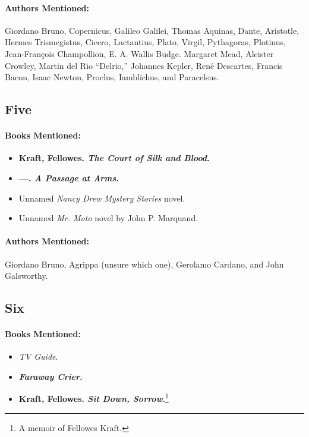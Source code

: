 \documentclass[12pt]{article}
\providecommand{\tightlist}{%
  \setlength{\itemsep}{0pt}\setlength{\parskip}{0pt}}
\begin{document}
\paragraph{Authors Mentioned:}\label{authors-mentioned-8}

Giordano Bruno, Copernicus, Galileo Galilei, Thomas Aquinas, Dante, Aristotle, Hermes Trismegistus, Cicero, Lactantius, Plato, Virgil, Pythagoras, Plotinus, Jean-François Champollion, E. A. Wallis Budge. Margaret Mead, Aleister Crowley, Martin del Rio ``Delrio,'' Johannes Kepler, René Descartes, Francis Bacon, Isaac Newton, Proclus, Iamblichus, and Paracelsus.

\subsection{Five}\label{five-1}

\paragraph{Books Mentioned:}\label{books-mentioned-12}

\begin{itemize}
\tightlist
\item
  \textbf{Kraft, Fellowes. \emph{The Court of Silk and Blood}.}
\item
  \textbf{---. \emph{A Passage at Arms}.}
\item
  Unnamed \emph{Nancy Drew Mystery Stories} novel.
\item
  Unnamed \emph{Mr. Moto} novel by John P. Marquand.
\end{itemize}

\paragraph{Authors Mentioned:}\label{authors-mentioned-9}

Giordano Bruno, Agrippa (unsure which one), Gerolamo Cardano, and John Galsworthy.

\subsection{Six}\label{six-1}

\paragraph{Books Mentioned:}\label{books-mentioned-13}

\begin{itemize}
\tightlist
\item
  \emph{TV Guide}.
\item
  \textbf{\emph{Faraway Crier}.}
\item
  \textbf{Kraft, Fellowes. \emph{Sit Down, Sorrow}.}\footnote{A memoir of Fellowes Kraft.}
\end{itemize}
\end{document}
